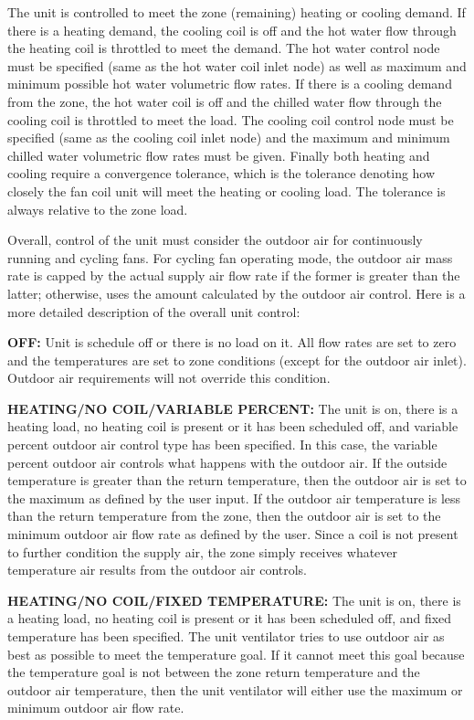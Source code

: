 The unit is controlled to meet the zone (remaining) heating or cooling demand. If there is a heating demand, the cooling coil is off and the hot water flow through the heating coil is throttled to meet the demand. The hot water control node must be specified (same as the hot water coil inlet node) as well as maximum and minimum possible hot water volumetric flow rates. If there is a cooling demand from the zone, the hot water coil is off and the chilled water flow through the cooling coil is throttled to meet the load. The cooling coil control node must be specified (same as the cooling coil inlet node) and the maximum and minimum chilled water volumetric flow rates must be given. Finally both heating and cooling require a convergence tolerance, which is the tolerance denoting how closely the fan coil unit will meet the heating or cooling load. The tolerance is always relative to the zone load.

Overall, control of the unit must consider the outdoor air for continuously running and cycling fans. For cycling fan operating mode, the outdoor air mass rate is capped by the actual supply air flow rate if the former is greater than the latter; otherwise, uses the amount calculated by the outdoor air control. Here is a more detailed description of the overall unit control:

\textbf{OFF:} Unit is schedule off or there is no load on it. All flow rates are set to zero and the temperatures are set to zone conditions (except for the outdoor air inlet). Outdoor air requirements will not override this condition.

\textbf{HEATING/NO COIL/VARIABLE PERCENT:} The unit is on, there is a heating load, no heating coil is present or it has been scheduled off, and variable percent outdoor air control type has been specified. In this case, the variable percent outdoor air controls what happens with the outdoor air. If the outside temperature is greater than the return temperature, then the outdoor air is set to the maximum as defined by the user input. If the outdoor air temperature is less than the return temperature from the zone, then the outdoor air is set to the minimum outdoor air flow rate as defined by the user. Since a coil is not present to further condition the supply air, the zone simply receives whatever temperature air results from the outdoor air controls.

\textbf{HEATING/NO COIL/FIXED TEMPERATURE:} The unit is on, there is a heating load, no heating coil is present or it has been scheduled off, and fixed temperature has been specified. The unit ventilator tries to use outdoor air as best as possible to meet the temperature goal. If it cannot meet this goal because the temperature goal is not between the zone return temperature and the outdoor air temperature, then the unit ventilator will either use the maximum or minimum outdoor air flow rate.

